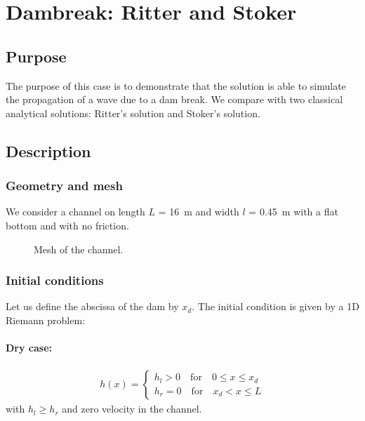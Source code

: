 \chapter{Dambreak: Ritter and Stoker}

\section{Purpose}

The purpose of this case is to demonstrate that the  solution is
able to simulate the propagation of a wave due to a dam break.
We compare  with two classical analytical solutions:
Ritter's solution and Stoker's solution.

\section{Description}

\subsection{Geometry and mesh}

We consider a channel on length $L$ = 16~m and width $l$ = 0.45~m with a flat
bottom and with no friction.

\begin{figure}[H]
   \centering
 \caption{Mesh of the channel.} \label{fig:rittermesh}
\end{figure}

\subsection{Initial conditions}

Let us define the abscissa of the dam by $x_d$.
The initial condition is given by a 1D Riemann problem:

\subsubsection{Dry case:}

\begin{equation}
\begin{split}h(x) = \begin{cases}
h_l > 0 \quad \text{for} \quad 0 \leq x \leq x_d \\
h_r = 0 \quad \text{for} \quad x_d < x \leq L
\end{cases}\end{split}
\end{equation}
with $h_l \geq h_r$ and zero velocity in the channel.

